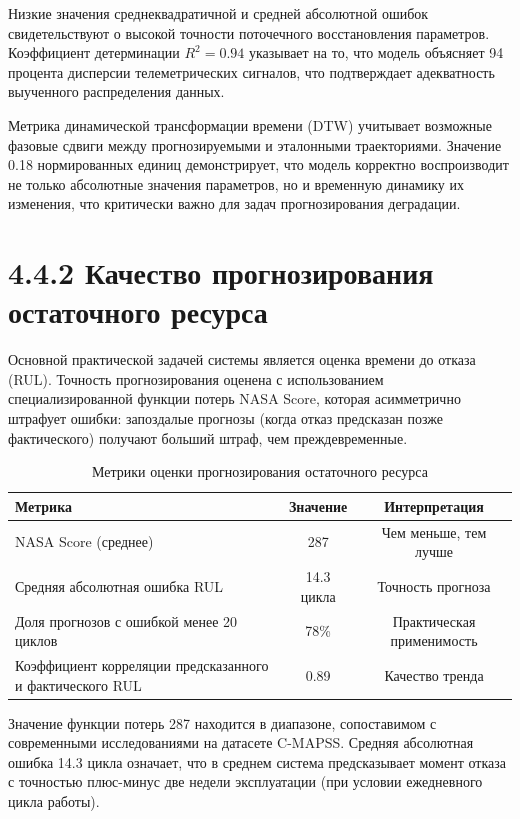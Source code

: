 \documentclass[14pt, a4paper, oneside]{extreport}
\begin{document}
Низкие значения среднеквадратичной и средней абсолютной ошибок свидетельствуют о высокой точности поточечного восстановления параметров. Коэффициент детерминации $R^2 = 0.94$ указывает на то, что модель объясняет 94 процента дисперсии телеметрических сигналов, что подтверждает адекватность выученного распределения данных.

Метрика динамической трансформации времени (DTW) учитывает возможные фазовые сдвиги между прогнозируемыми и эталонными траекториями. Значение 0.18 нормированных единиц демонстрирует, что модель корректно воспроизводит не только абсолютные значения параметров, но и временную динамику их изменения, что критически важно для задач прогнозирования деградации.

\vspace{1em}
\section{4.4.2 Качество прогнозирования остаточного ресурса}
\vspace{1em}

Основной практической задачей системы является оценка времени до отказа (RUL). Точность прогнозирования оценена с использованием специализированной функции потерь NASA Score, которая асимметрично штрафует ошибки: запоздалые прогнозы (когда отказ предсказан позже фактического) получают больший штраф, чем преждевременные.

\begin{table}[htbp]
\centering
\caption{Метрики оценки прогнозирования остаточного ресурса}
\label{tab:rul_metrics}
\begin{tabular}{lcc}
\hline
Метрика & Значение & Интерпретация \\
\hline
NASA Score (среднее) & 287 & Чем меньше, тем лучше \\
Средняя абсолютная ошибка RUL & 14.3 цикла & Точность прогноза \\
Доля прогнозов с ошибкой менее 20 циклов & 78\% & Практическая применимость \\
Коэффициент корреляции предсказанного и фактического RUL & 0.89 & Качество тренда \\
\hline
\end{tabular}
\end{table}

Значение функции потерь 287 находится в диапазоне, сопоставимом с современными исследованиями на датасете C-MAPSS. Средняя абсолютная ошибка 14.3 цикла означает, что в среднем система предсказывает момент отказа с точностью плюс-минус две недели эксплуатации (при условии ежедневного цикла работы).
\end{document}
